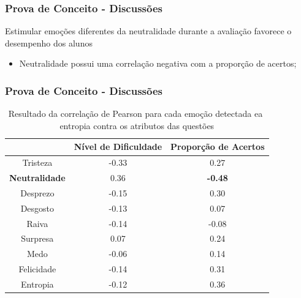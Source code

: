 \documentclass{beamer}
\begin{document}
\begin{frame}
\frametitle{Prova de Conceito - Discussões}
\begin{block}{Estimular emo\c{c}\~oes diferentes da neutralidade durante a avalia\c{c}\~ao favorece o desempenho dos alunos}
\begin{itemize}
\pause
\item Neutralidade possui uma correla\c{c}\~ao negativa com a propor\c{c}\~ao de acertos;
\end{itemize}
\end{block}

\end{frame}

\begin{frame}
\frametitle{Prova de Conceito - Discussões}
\begin{table}[]\footnotesize
\centering
\caption{Resultado​ ​da​ ​correla\c{c}\~ao​ ​de​ ​Pearson​ ​para​ ​cada​ ​emo\c{c}\~ao​ ​detectada
e​ ​a​ ​entropia​ ​contra​ ​os​ ​atributos​ ​das​ ​quest\~oes}
\label{my-label}
\begin{tabular}{|c|c|c|}
\hline
                      & \textbf{Nível de Dificuldade} & \textbf{Proporção de Acertos} \\ \hline
Tristeza	     & -0.33                & 0.27                          \\ \hline
\small \textbf{Neutralidade} & 0.36                 & \small \textbf{-0.48}                \\ \hline
Desprezo     		& -0.15                         & 0.30                 \\ \hline
Desgosto              & -0.13                         & 0.07                          \\ \hline
Raiva                 & -0.14                         & -0.08                         \\ \hline
Surpresa              & 0.07                          & 0.24                          \\ \hline
Medo                  & -0.06                         & 0.14                          \\ \hline
Felicidade   		& -0.14                         & 0.31                 \\ \hline
Entropia     		& -0.12                         & 0.36                 \\ \hline
\end{tabular}
\end{table}
\end{frame}
\end{document}
